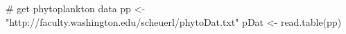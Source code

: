 \begin{Schunk}
\begin{Sinput}
 # get phytoplankton data
 pp <- "http://faculty.washington.edu/scheuerl/phytoDat.txt"
 pDat <- read.table(pp)
\end{Sinput}
\end{Schunk}
